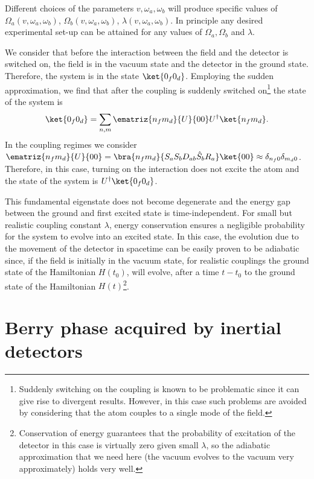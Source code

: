 Different choices of the parameters $v, \omega_a,\omega_b$  will produce specific values of $\Omega_a(v,\omega_a,\omega_b)$, $\Omega_b(v,\omega_a,\omega_b)$, $\lambda(v,\omega_a,\omega_b)$. In principle any desired experimental set-up can be attained for any values of $\Omega_a,\Omega_b$ and $\lambda$.

We consider that before the interaction between the field and the detector is switched on, the field is in the vacuum state and the detector in the ground state. Therefore, the system is in the state $\ket{0_f0_d}$. Employing the sudden approximation, we find that after the coupling is suddenly switched on\footnote{Suddenly switching on the coupling is known to be problematic since it can give rise to divergent results. However, in this case such problems are avoided by considering that the atom couples to a single mode of the field.}  the state of the system is
\begin{equation}\label{adiab}
\ket{0_f0_d}=\sum_{n,m} \ematriz{n_fm_d}{U}{00}U^\dagger \ket{n_fm_d}.
\end{equation}
In the coupling regimes we consider  $\ematriz{n_fm_d}{U}{00}= \bra{n_fm_d}{S_aS_bD_{ab}\hat S_b R_a}\ket{00}\approx \delta_{n_f0}\delta_{m_d0}$. Therefore, in this case, turning on the interaction does not excite the atom and the state of the system is  $U^\dagger\ket{0_f0_d}$. 

This fundamental eigenstate does not become degenerate and the energy gap between the ground and first excited state is time-independent.  For small but realistic coupling constant $\lambda$, energy conservation ensures a negligible probability for the system to evolve into an excited state.  In this case, the evolution due to the movement of the detector in spacetime  can be easily proven to be adiabatic since, if the field is initially in the vacuum state, for realistic couplings the ground state of the Hamiltonian $H(t_0)$, will evolve, after a time  $t-t_0$ to the ground state of the Hamiltonian $H(t)$\footnote{Conservation of energy guarantees that the probability of excitation of the detector in this case is virtually zero given small $\lambda$, so the adiabatic approximation that we need here (the vacuum evolves to the vacuum very approximately) holds very well.}. 

\section{Berry phase acquired by inertial detectors}

